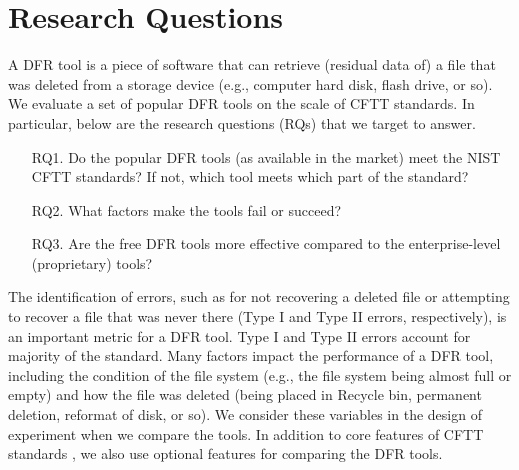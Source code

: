 \section{Research Questions}

A DFR tool is a piece of software that can retrieve (residual data of) a file that was deleted 
from a storage device (e.g., computer hard disk, flash drive, or so). We evaluate a set of 
popular DFR tools on the scale of CFTT standards. 
In particular, below are the research questions (RQs) that we target to answer. 

\begin{itemize}
\item[RQ1.] Do the popular DFR tools (as available in the market) meet the NIST CFTT standards? 
If not, which tool meets which part of the standard? 

\item[RQ2.] What factors make the tools fail or succeed?

\item[RQ3.] Are the free DFR tools more effective compared to the enterprise-level (proprietary) tools?
\end{itemize}

The identification of errors, such as for not recovering a deleted file or attempting to recover a file that was never there 
(Type I and Type II errors, respectively), is an important metric for a DFR tool. 
Type I and Type II errors account for majority of the standard. Many factors impact the performance of a DFR tool, 
including the condition of the file system (e.g., the file system being almost full or empty) and 
how the file was deleted (being placed in Recycle bin, permanent deletion, reformat of disk, or so). 
We consider these variables in the design of experiment when we compare the tools.
In addition to core features of CFTT standards \cite{cftt:nist}, we also use optional features \cite{cftt:nist} for comparing the DFR tools.

